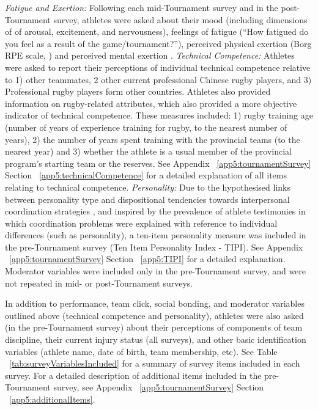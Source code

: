 \textit{Fatigue and Exertion:} Following each mid-Tournament survey and in the post-Tournament survey, athletes were asked about their mood (including dimensions of  of arousal, excitement, and nervousness), feelings of fatigue (``How fatigued do you feel as a result of the game/tournament?''), perceived physical exertion (Borg RPE scale, \citep{Borg1990}) and perceived mental exertion \citep[see][ ]{Noakes2012a}.  \textit{Technical Competence:} Athletes were asked to report their perceptions of individual technical competence relative to 1) other teammates, 2 other current professional Chinese rugby players, and  3) Professional rugby players form other countries.  Athletes also provided information on rugby-related attributes, which also provided a more objective indicator of technical competence.  These measures included: 1) rugby training age (number of years of experience training for rugby, to the nearest number of years), 2) the number of years spent training with the provincial teams (to the nearest year) and 3) whether the athlete is a usual member of the provincial program's starting team or the reserves.  See Appendix ~\ref{app5:tournamentSurvey} Section ~\ref{app5:technicalCompetence} for a detailed explanation of all items relating to technical competence.  \textit{Personality:} Due to the hypothesised links between personality type and dispositional tendencies towards interpersonal coordination strategies \citep[see for example][]{Marsh2009}, and inspired by the prevalence of athlete testimonies in which coordination problems were explained with reference to individual differences (such as personality),  a ten-item personality measure was included in the pre-Tournament survey (Ten Item Personality Index - TIPI)\citep{Gosling2003}. See Appendix ~\ref{app5:tournamentSurvey} Section ~\ref{app5:TIPI} for a detailed explanation.  Moderator variables were included only in the pre-Tournament survey, and were not repeated in mid- or post-Tournament surveys.

In addition to performance, team click, social bonding, and moderator variables outlined above (technical competence and personality), athletes were also asked (in the pre-Tournament survey) about their perceptions of components of team discipline, their current injury status (all surveys), and other basic identification variables (athlete name, date of birth, team membership, etc).  See Table ~\ref{tab:surveyVariablesIncluded} for a summary of survey items included in each survey.  For a detailed description of additional items included in the pre-Tournament survey, see Appendix ~\ref{app5:tournamentSurvey} Section ~\ref{app5:additionalItems}.


